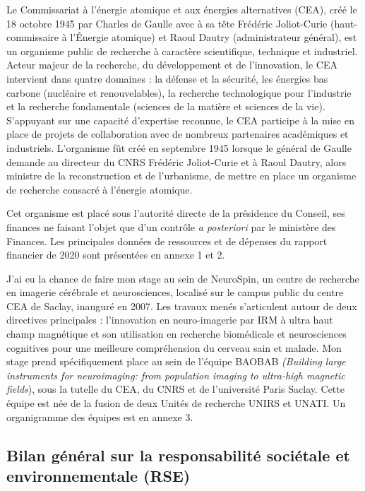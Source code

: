 \documentclass[12pt, oneside, a4paper, titlepage]{article}
\begin{document}
Le Commissariat à l’énergie atomique et aux énergies alternatives (CEA), créé le 18 octobre 1945 par Charles de Gaulle avec à sa tête Frédéric Joliot-Curie (haut-commissaire à l’Énergie atomique) et Raoul Dautry (administrateur général), est un organisme public de recherche à caractère scientifique, technique et industriel. Acteur majeur de la recherche, du développement et de l'innovation, le CEA intervient dans quatre domaines : la défense et la sécurité, les énergies bas carbone (nucléaire et renouvelables), la recherche technologique pour l'industrie et la recherche fondamentale (sciences de la matière et sciences de la vie). S'appuyant sur une capacité d'expertise reconnue, le CEA participe à la mise en place de projets de collaboration avec de nombreux partenaires académiques et industriels. L’organisme fût créé en septembre 1945 lorsque le général de Gaulle demande au directeur du CNRS Frédéric Joliot-Curie et à Raoul Dautry, alors ministre de la reconstruction et de l'urbanisme, de mettre en place un organisme de recherche consacré à l'énergie atomique. 

\vspace{5mm} 
 Cet organisme est placé sous l’autorité directe de la présidence du Conseil, ses finances ne faisant l’objet que d’un contrôle \textit{a posteriori} par le ministère des Finances. Les principales données de ressources et de dépenses du rapport financier de 2020 sont présentées en annexe 1 et 2.

\vspace{5mm} 
J'ai eu la chance de faire mon stage au sein de NeuroSpin, un centre de recherche en imagerie cérébrale et neurosciences, localisé sur le campus public du centre CEA de Saclay, inauguré en 2007. Les travaux menés s’articulent autour de deux directives principales : l’innovation en neuro-imagerie par IRM à ultra haut champ magnétique et son utilisation en recherche biomédicale et neurosciences cognitives pour une meilleure compréhension du cerveau sain et malade. Mon stage prend spécifiquement place au sein de l'équipe BAOBAB \textit{(Building large instruments for neuroimaging: from population imaging to ultra-high magnetic fields}), sous la tutelle du CEA, du CNRS et de l'université Paris Saclay. Cette équipe est née de la fusion de deux Unités de recherche UNIRS et UNATI. Un organigramme des équipes est en annexe 3.


\subsection{Bilan général sur la responsabilité sociétale et environnementale (RSE)}
\end{document}

